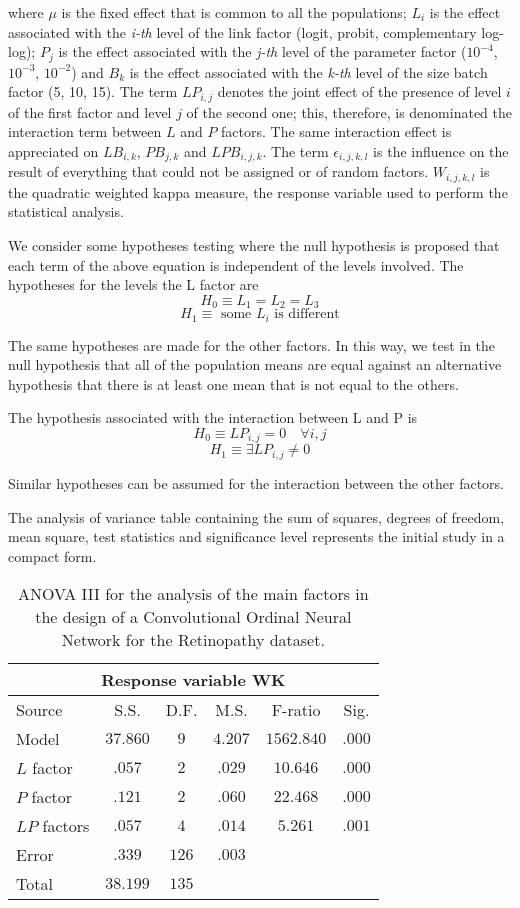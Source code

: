 \documentclass[10pt, a4paper, titlepage, twocolumn]{article}
\begin{document}
	where $\mu$ is the fixed effect that is common to all the populations; $L_i$ is the effect associated with the \textit{i-th} level of the link factor (logit, probit, complementary log-log); $P_j$ is the effect associated with the \textit{j-th} level of the parameter factor ($10^{-4}$, $10^{-3}$, $10^{-2}$) and $B_k$ is the effect associated with the \textit{k-th} level of the size batch factor (5, 10, 15). The term $LP_{i,j}$ denotes the joint effect of the presence of level $i$ of the first factor and level $j$ of the second one; this, therefore, is denominated the interaction term between $L$ and $P$ factors. The same interaction effect is appreciated on $LB_{i,k}$, $PB_{j,k}$ and $LPB_{i,j,k}$. The term $\epsilon_{i,j,k,l}$ is the influence on the result of everything that could not be assigned or of random factors. $W_{i,j,k,l}$ is the quadratic weighted kappa measure, the response variable used to perform the statistical analysis.
	
	We consider some hypotheses testing where the null hypothesis is proposed that each term of the above equation is independent of the levels involved. The hypotheses for the levels the L factor are
	\[
		H_0 \equiv L_1 = L_2 = L_3
	\]
	\[
		H_1 \equiv \text{ some } L_i \text{ is different}
	\]
	
	The same hypotheses are made for the other factors. In this way, we test in the null hypothesis that all of the population means are equal against an alternative hypothesis that there is at least one mean that is not equal to the others.
	
	The hypothesis associated with the interaction between L and P is
	\[
		H_0 \equiv LP_{i,j} = 0 \quad \forall i,j
	\]
	\[
		H_1 \equiv \exists LP_{i,j} \ne 0
	\]
	
	Similar hypotheses can be assumed for the interaction between the other factors.
	
	The analysis of variance table containing the sum of squares, degrees of freedom, mean square, test statistics and significance level represents the initial study in a compact form.
	
	\begin{table}[htbp]
		\centering
		\small
		\begin{tabular}{l|ccccc}
			\multicolumn{6}{c}{Response variable WK}\\\hline
			Source & S.S. & D.F. & M.S. & F-ratio & Sig.\\\hline
			Model & $37.860$ & $9$ & $4.207$ & $1562.840$ & $.000$\\
			$L$ factor & $.057$ & $2$ & $.029$ & $10.646$ & $.000$\\
			$P$ factor & $.121$ & $2$ & $.060$ & $22.468$ & $.000$\\
			$LP$ factors & $.057$ & $4$ & $.014$ & $5.261$ & $.001$\\
			Error & $.339$ & $126$ & $.003$ & & \\
			Total & $38.199$ & $135$ & & & 
		\end{tabular}
		\caption{ANOVA III for the analysis of the main factors in the design of a Convolutional Ordinal Neural Network for the Retinopathy dataset.}
		\label{table:ANOVARetinopathy}
	\end{table}
	
\end{document}
